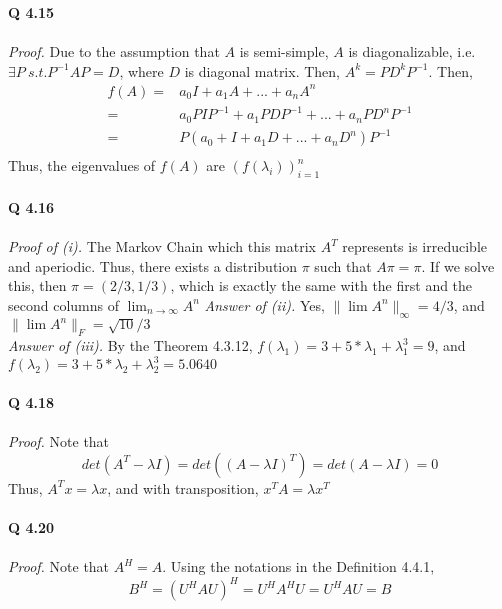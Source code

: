 \documentclass[letterpaper,12pt]{article}
\theoremstyle{definition}
\begin{document}
\textbf{Q 4.15} \\\\
\emph{Proof.} Due to the assumption that $A$ is semi-simple, $A$ is diagonalizable, i.e. $\exists P \ s.t. P^{-1}AP = D$, where $D$ is diagonal matrix. Then, $A^k = P D^k P^{-1}$. Then,
\begin{align*}
 f(A) =& a_0 I + a_1 A + ... + a_n A^n  \\
    =& a_0 PIP^{-1} + a_1 PDP^{-1} + ... + a_n PD^{n}P^{-1} \\
   =& P(a_0 + I + a_1 D + ... + a_n D^n)P^{-1} \\
\end{align*}
Thus, the eigenvalues of $f(A)$ are $(f(\lambda_i))_{i=1}^{n}$ \\\\
\textbf{Q 4.16} \\\\
\emph{Proof of (i).} The Markov Chain which this matrix $A^T$ represents is irreducible and aperiodic. Thus, there exists a distribution $\pi$ such that $A \pi  = \pi$. If we solve this, then $\pi = (2/3,1/3) $, which is exactly the same with the first and the second columns of $\lim_{n \rightarrow \infty} A^n$
\newline
\emph{Answer of (ii).} Yes, $\| \lim A^n \|_{\infty} = 4/3 $, and $\| \lim A^n \|_{F} = \sqrt{10}/3$ \\
\emph{Answer of (iii).} By the Theorem 4.3.12, $f(\lambda_1) = 3 + 5*\lambda_1 + \lambda_{1}^{3} = 9$, and $f(\lambda_2) = 3 + 5*\lambda_2 + \lambda_{2}^{3} = 5.0640$ \\\\
\textbf{Q 4.18} \\\\
\emph{Proof.} Note that
\[det(A^T - \lambda I ) = det((A-\lambda I)^T) = det(A-\lambda I)=0\]
Thus, $A^T x = \lambda x$, and with transposition, $x^T A = \lambda x^T$ \\\\
\textbf{Q 4.20} \\\\
\emph{Proof. } Note that $A^H = A$. Using the notations in the Definition 4.4.1,
\[B^H = (U^H A U)^H = U^H A^H U = U^H A U = B \]
\end{document}
